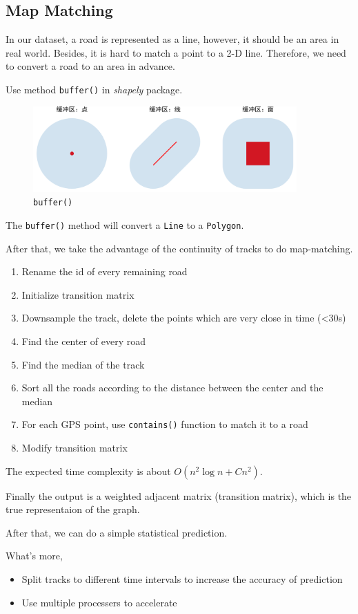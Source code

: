 \documentclass[fontset=none]{ctexart}
\theoremstyle{definition}
\theoremstyle{remark}
\begin{document}
\subsection{Map Matching}
In our dataset, a road is represented as a line, however, it should be an area in real world.
Besides, it is hard to match a point to a 2-D line. Therefore, we need to convert a road to an area in advance.

Use method \texttt{buffer()} in \textit{shapely} package.
\begin{figure}[htb]
  \centering
  \includegraphics[width=0.9\textwidth]{images/buffer_example.png}
  \caption{\texttt{buffer()}}
  \label{fig: buffer}
\end{figure}

The \texttt{buffer()} method will convert a \texttt{Line} to a \texttt{Polygon}.

After that, we take the advantage of the continuity of tracks to do map-matching.
\begin{enumerate}
  \item Rename the id of every remaining road
  \item Initialize transition matrix
  \item Downsample the track, delete the points which are very close in time (<30s)
  \item Find the center of every road
  \item Find the median of the track
  \item Sort all the roads according to the distance between the center and the median
  \item For each GPS point, use \texttt{contains()} function to match it to a road
  \item Modify transition matrix
\end{enumerate}

The expected time complexity is about $O(n^2\log n+Cn^2)$.

Finally the output is a weighted adjacent matrix (transition matrix), which is the true representaion of the graph.

After that, we can do a simple statistical prediction.

What's more,
\begin{itemize}
  \item Split tracks to different time intervals to increase the accuracy of prediction
  \item Use multiple processers to accelerate
\end{itemize}


% 
% 
\end{document}

